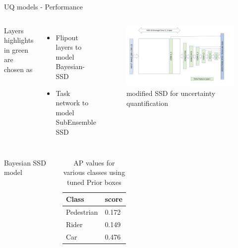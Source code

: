 \documentclass[10pt, aspectratio=169]{beamer}
\begin{document}
\begin{frame}[allowframebreaks]{UQ models - Performance}
    \begin{columns}
            Layers highlights in green are chosen as 
            \begin{itemize}
                \setlength\itemsep{1em}
                \item Flipout layers to model Bayesian-SSD
                \item Task network to model SubEnsemble SSD
            \end{itemize} 
            \begin{figure}
                \includegraphics[scale=0.25]{images/SSD300_flipout.jpg}
                \caption{modified SSD for uncertainty quantification}
            \end{figure}
    \end{columns}
    \pagebreak
    \begin{itemize}
        \begin{columns}
            \item Bayesian SSD model
                \begin{table}
                    \caption{AP values for various classes using tuned Prior boxes}
                    \begin{tabular}{ll}
                        \hline
                            \textbf{Class} & \textbf{score} \\ \hline
                            Pedestrian     & 0.172            \\ \hline
                            Rider          & 0.149              \\ \hline
                            Car            & 0.476              \\ \hline

\end{tabular}
\end{table}
\end{columns}
\end{itemize}
\end{frame}
\end{document}
